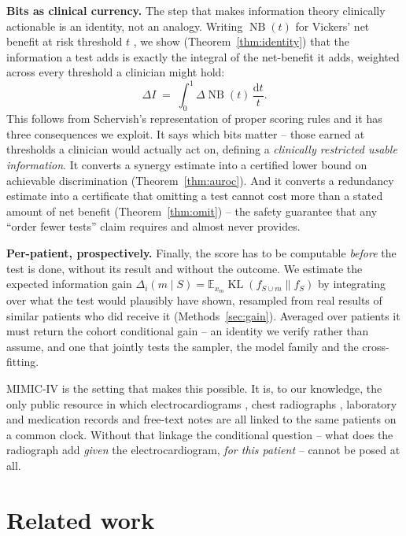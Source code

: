 \documentclass[11pt]{article}
\theoremstyle{definition}
\theoremstyle{remark}
\DeclareMathOperator{\KL}{KL}
\DeclareMathOperator{\NB}{NB}
\begin{document}
\textbf{Bits as clinical currency.} The step that makes information theory
clinically actionable is an identity, not an analogy. Writing $\NB(t)$ for
Vickers' net benefit at risk threshold $t$ \citep{vickers2006decision}, we show
(Theorem~\ref{thm:identity}) that the information a test adds is exactly the
integral of the net-benefit it adds, weighted across every threshold a clinician
might hold:
\[
\Delta I \;=\; \int_0^1 \Delta \NB(t)\,\frac{\mathrm{d}t}{t}.
\]
This follows from Schervish's representation of proper scoring rules
\citep{schervish1989general} and it has three consequences we exploit. It says
which bits matter -- those earned at thresholds a clinician would actually act
on, defining a \emph{clinically restricted usable information}. It converts a
synergy estimate into a certified lower bound on achievable discrimination
(Theorem~\ref{thm:auroc}). And it converts a redundancy estimate into a
certificate that omitting a test cannot cost more than a stated amount of net
benefit (Theorem~\ref{thm:omit}) -- the safety guarantee that any
``order fewer tests'' claim requires and almost never provides.

\textbf{Per-patient, prospectively.} Finally, the score has to be computable
\emph{before} the test is done, without its result and without the outcome. We
estimate the expected information gain
$\Delta_i(m\mid S) = \mathbb{E}_{x_m}\KL(f_{S\cup m}\|f_S)$ by integrating over
what the test would plausibly have shown, resampled from real results of similar
patients who did receive it (Methods~\ref{sec:gain}). Averaged over patients it
must return the cohort conditional gain -- an identity we verify rather than
assume, and one that jointly tests the sampler, the model family and the
cross-fitting.

MIMIC-IV is the setting that makes this possible. It is, to our knowledge, the
only public resource in which electrocardiograms \citep{gow2023mimicecg}, chest
radiographs \citep{johnson2019mimiccxr}, laboratory and medication records
\citep{johnson2023mimiciv} and free-text notes \citep{johnson2023mimicnote} are
all linked to the same patients on a common clock. Without that linkage the
conditional question -- what does the radiograph add \emph{given} the
electrocardiogram, \emph{for this patient} -- cannot be posed at all.

\section{Related work}
\label{sec:related}
\end{document}
